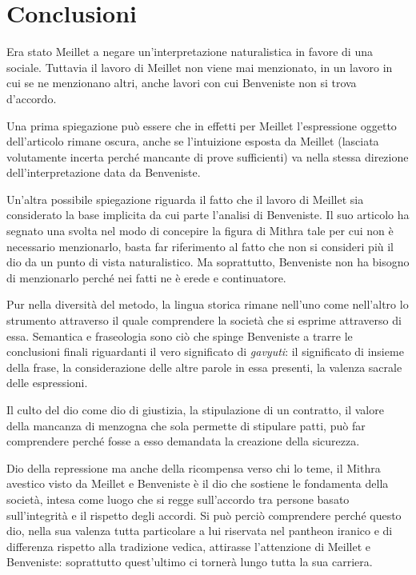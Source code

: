 \documentclass[output=paper]{langsci/langscibook}
\begin{document}
\section{Conclusioni}

Era stato Meillet a negare un’interpretazione naturalistica in favore di una sociale. Tuttavia il lavoro di Meillet non viene mai menzionato, in un lavoro in cui se ne menzionano altri, anche lavori con cui Benveniste non si trova d’accordo.

Una prima spiegazione può essere che in effetti per Meillet l’espressione oggetto dell’articolo rimane oscura, anche se l’intuizione esposta da Meillet (lasciata volutamente incerta perché mancante di prove sufficienti) va nella stessa direzione dell’interpretazione data da Benveniste.

Un’altra possibile spiegazione riguarda il fatto che il lavoro di Meillet sia considerato la base implicita da cui parte l’analisi di Benveniste. Il suo articolo ha segnato una svolta nel modo di concepire la figura di Mithra tale per cui non è necessario menzionarlo, basta far riferimento al fatto che non si consideri più il dio da un punto di vista naturalistico. Ma soprattutto, Benveniste non ha bisogno di menzionarlo perché nei fatti ne è erede e continuatore.

Pur nella diversità del metodo, la lingua storica rimane nell’uno come nell’altro lo strumento attraverso il quale comprendere la società che si esprime attraverso di essa. Semantica e fraseologia sono ciò che spinge Benveniste a trarre le conclusioni finali riguardanti il vero significato di \textit{gavyuti}: il significato di insieme della frase, la considerazione delle altre parole in essa presenti, la valenza sacrale delle espressioni.

Il culto del dio come dio di giustizia, la stipulazione di un contratto, il valore della mancanza di menzogna che sola permette di stipulare patti, può far comprendere perché fosse a esso demandata la creazione della sicurezza.

Dio della repressione ma anche della ricompensa verso chi lo teme, il Mithra avestico visto da Meillet e Benveniste è il dio che sostiene le fondamenta della società, intesa come luogo che si regge sull’accordo tra persone basato sull’integrità e il rispetto degli accordi. Si può perciò comprendere perché questo dio, nella sua valenza tutta particolare a lui riservata nel pantheon iranico e di differenza rispetto alla tradizione vedica, attirasse l’attenzione di Meillet e Benveniste: soprattutto quest’ultimo ci tornerà lungo tutta la sua carriera.
\end{document}
